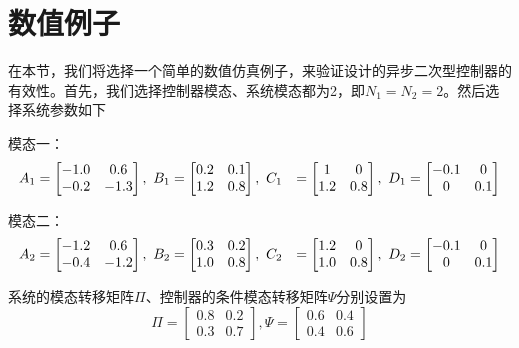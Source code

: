 \section{数值例子}
	在本节，我们将选择一个简单的数值仿真例子，来验证设计的异步二次型控制器的有效性。首先，我们选择控制器模态、系统模态都为2，即$N_1=N_2=2$。然后选择系统参数如下
	
	模态一：
	\begin{equation} \notag
	\begin{aligned}
	A_{1} &= \begin{bmatrix}
	-1.0&0.6\\
	-0.2&-1.3
	\end{bmatrix}, \ 
	B_{1} = \begin{bmatrix}
	0.2&0.1\\ 1.2&0.8
	\end{bmatrix} ,\
		C_{1} &= \begin{bmatrix}
	1&0\\1.2&0.8
	\end{bmatrix},\
	D_{1} = \begin{bmatrix}
	-0.1&0\\0&0.1
	\end{bmatrix}
	\end{aligned}  
	\end{equation}
	
	模态二：
	\begin{equation} \notag
	\begin{aligned}
	A_{2} &= \begin{bmatrix}
	-1.2&0.6\\
	-0.4&-1.2
	\end{bmatrix}, \ 
	B_{2} = \begin{bmatrix}
	0.3&0.2\\ 1.0&0.8
	\end{bmatrix} ,\
	C_{2} &= \begin{bmatrix}
	1.2&0\\1.0&0.8
	\end{bmatrix},\
	D_{2} = \begin{bmatrix}
	-0.1&0\\0&0.1
	\end{bmatrix}
	\end{aligned}  
	\end{equation}
	
	系统的模态转移矩阵$\varPi$、控制器的条件模态转移矩阵$\varPsi$分别设置为
	\begin{equation}
		\varPi = \begin{bmatrix}
		0.8& 0.2\\ 0.3& 0.7
		\end{bmatrix},    %
		\varPsi = \begin{bmatrix}
			0.6& 0.4\\0.4 &0.6
		\end{bmatrix}
	\end{equation}
	
